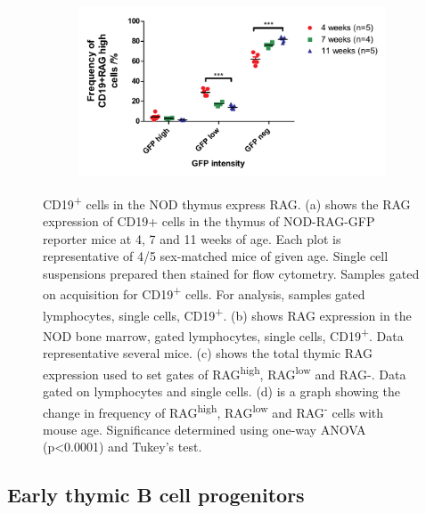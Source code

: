 \begin{figure}
\begin{subfigure}{0.5\textwidth}
	\caption{}
	\label{subfig:totalthyRAG}
	\end{subfigure}
	\begin{subfigure}{\textwidth}
	\includegraphics[width=\textwidth]{Figures/RAGhighlownegative.pdf}
	\caption{}
	\label{subfig:RAGhighlowneggraph}
	\end{subfigure}
\caption[Some CD19\textsuperscript{+} cells in the thymus appear to be expressing RAG]{CD19\textsuperscript{+} cells in the NOD thymus express RAG. 
(a) shows the RAG expression of CD19+ cells in the thymus of NOD-RAG-GFP reporter mice at 4, 7 and 11 weeks of age. Each plot is representative of 4/5 sex-matched mice of given age. Single cell suspensions prepared then stained for flow cytometry. Samples gated on acquisition for CD19\textsuperscript{+} cells. For analysis, samples gated lymphocytes, single cells, CD19\textsuperscript{+}. (b) shows RAG expression in the NOD bone marrow, gated lymphocytes, single cells, CD19\textsuperscript{+}. Data representative several mice. (c) shows the total thymic RAG expression used to set gates of RAG\textsuperscript{high}, RAG\textsuperscript{low} and RAG-. Data gated on lymphocytes and single cells. (d) is a graph showing the change in frequency of RAG\textsuperscript{high}, RAG\textsuperscript{low} and RAG\textsuperscript{-} cells with mouse age. Significance determined using one-way ANOVA (p<0.0001) and Tukey's test.} 
\label{fig:GFP}
\end{figure}




\subsection{Early thymic B cell progenitors}
\label{subsec:earlyprogens}


